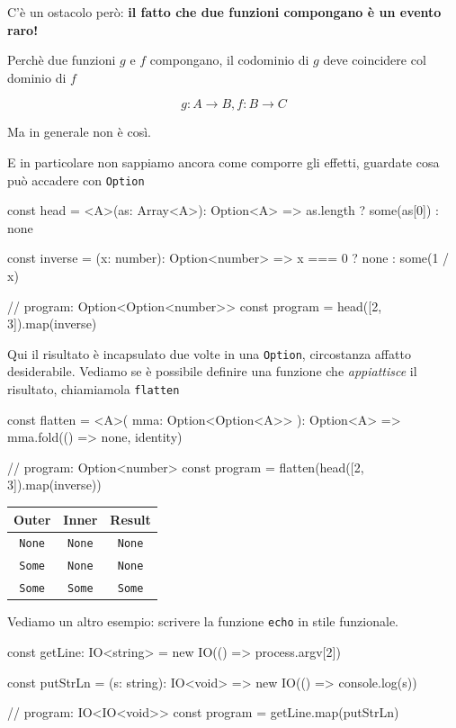\documentclass[12pt]{article}
\theoremstyle{definition}
\newenvironment{code}
  {\vspace{0.5cm} \VerbatimEnvironment\begin{typescriptcode}}
  {\end{typescriptcode} \vspace{0.2cm}}
\begin{document}
C'è un ostacolo però: \textbf{il fatto che due funzioni compongano è un evento raro!}

Perchè due funzioni $g$ e $f$ compongano, il codominio di $g$ deve coincidere col dominio di $f$

$$
g: A \rightarrow B, f: B \rightarrow C
$$

Ma in generale non è così.

E in particolare non sappiamo ancora come comporre gli effetti, guardate cosa può accadere con \texttt{Option}

\begin{code}
const head = <A>(as: Array<A>): Option<A> =>
  as.length ? some(as[0]) : none

const inverse = (x: number): Option<number> =>
  x === 0 ? none : some(1 / x)

// program: Option<Option<number>>
const program = head([2, 3]).map(inverse)
\end{code}

Qui il risultato è incapsulato due volte in una \texttt{Option}, circostanza affatto desiderabile.
Vediamo se è possibile definire una funzione che \emph{appiattisce} il risultato, chiamiamola \texttt{flatten}

\begin{code}
const flatten = <A>(
  mma: Option<Option<A>>
): Option<A> => mma.fold(() => none, identity)

// program: Option<number>
const program = flatten(head([2, 3]).map(inverse))
\end{code}

\begin{center}
\begin{tabular}{ c c c }
 Outer & Inner & Result \\
 \hline
 \texttt{None} & \texttt{None} & \texttt{None} \\
 \texttt{Some} & \texttt{None} & \texttt{None} \\
 \texttt{Some} & \texttt{Some} & \texttt{Some}
\end{tabular}
\end{center}

Vediamo un altro esempio: scrivere la funzione \texttt{echo} in stile funzionale.

\begin{code}
const getLine: IO<string> = new IO(() => process.argv[2])

const putStrLn = (s: string): IO<void> =>
  new IO(() => console.log(s))

// program: IO<IO<void>>
const program = getLine.map(putStrLn)
\end{code}
\end{document}
